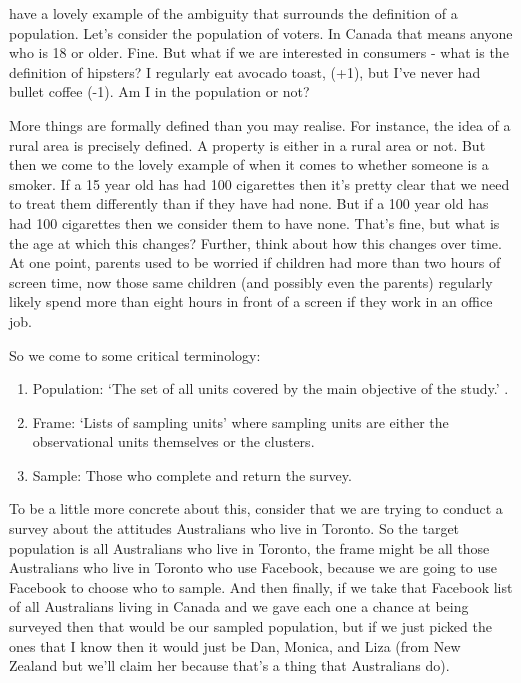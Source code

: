 \documentclass[
]{book}
\providecommand{\tightlist}{%
  \setlength{\itemsep}{0pt}\setlength{\parskip}{0pt}}
\begin{document}
\citet[p.~4]{wuandthompson} have a lovely example of the ambiguity that surrounds the definition of a population. Let's consider the population of voters. In Canada that means anyone who is 18 or older. Fine. But what if we are interested in consumers - what is the definition of hipsters? I regularly eat avocado toast, (+1), but I've never had bullet coffee (-1). Am I in the population or not?

More things are formally defined than you may realise. For instance, the idea of a rural area is precisely defined. A property is either in a rural area or not. But then we come to the lovely example of \citet[p.~4]{wuandthompson} when it comes to whether someone is a smoker. If a 15 year old has had 100 cigarettes then it's pretty clear that we need to treat them differently than if they have had none. But if a 100 year old has had 100 cigarettes then we consider them to have none. That's fine, but what is the age at which this changes? Further, think about how this changes over time. At one point, parents used to be worried if children had more than two hours of screen time, now those same children (and possibly even the parents) regularly likely spend more than eight hours in front of a screen if they work in an office job.

So we come to some critical terminology:

\begin{enumerate}
\def\labelenumi{\arabic{enumi}.}
\tightlist
\item
  Population: `The set of all units covered by the main objective of the study.' \citet[p.~5]{wuandthompson}.
\item
  Frame: `Lists of sampling units' \citet[p.~9]{wuandthompson} where sampling units are either the observational units themselves or the clusters.
\item
  Sample: Those who complete and return the survey.
\end{enumerate}

To be a little more concrete about this, consider that we are trying to conduct a survey about the attitudes Australians who live in Toronto. So the target population is all Australians who live in Toronto, the frame might be all those Australians who live in Toronto who use Facebook, because we are going to use Facebook to choose who to sample. And then finally, if we take that Facebook list of all Australians living in Canada and we gave each one a chance at being surveyed then that would be our sampled population, but if we just picked the ones that I know then it would just be Dan, Monica, and Liza (from New Zealand but we'll claim her because that's a thing that Australians do).
\end{document}
